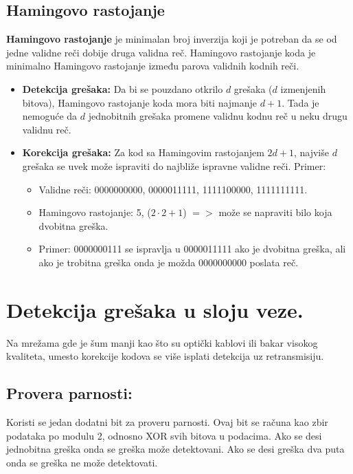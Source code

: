 \documentclass[a4paper]{article}
\begin{document}
\subsection{Hamingovo rastojanje} 
    \textbf{Hamingovo rastojanje} je minimalan broj inverzija koji je potreban
    da se od jedne validne reči dobije druga validna reč. Hamingovo rastojanje koda je minimalno Hamingovo
    rastojanje između parova validnih kodnih reči.
    \begin{itemize}
    \item \textbf{Detekcija grešaka:} Da bi se pouzdano otkrilo $d$ grešaka ($d$ izmenjenih bitova),
            Hamingovo rastojanje koda mora biti najmanje $d+1$. Tada je nemoguće da $d$ jednobitnih
            grešaka promene validnu kodnu reč u neku drugu validnu reč.
    \item \textbf{Korekcija grešaka:} Za kod sa Hamingovim rastojanjem $2d+1$, najviše $d$ grešaka
            se uvek može ispraviti do najbliže ispravne validne reči. Primer:
            \begin{itemize}
                \item Validne reči: 0000000000, 0000011111, 1111100000, 1111111111.
                \item Hamingovo rastojanje: 5, ($2\cdot2+1$) $=>$ može se napraviti bilo koja dvobitna 
                      greška.
                \item Primer: 0000000111 se ispravlja u 0000011111 ako je dvobitna greška,
                      ali ako je trobitna greška onda je možda 0000000000 poslata reč.
            \end{itemize}
    \end{itemize}

\section{Detekcija grešaka u sloju veze.}
    Na mrežama gde je šum manji kao što su optički kablovi ili bakar visokog kvaliteta, umesto
    korekcije kodova se više isplati detekcija uz retransmisiju. 

\subsection{Provera parnosti:} 
    Koristi se jedan dodatni bit za proveru parnosti. Ovaj bit
    se računa kao zbir podataka po modulu 2, odnosno XOR svih bitova u podacima. Ako se
    desi jednobitna greška onda se greška može detektovani. Ako se desi greška dva puta onda
    se greška ne može detektovati.
\end{document}
